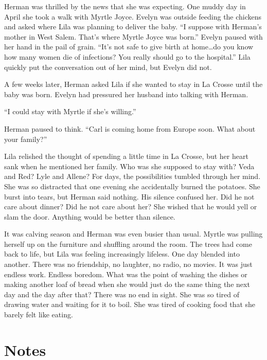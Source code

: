 \documentclass[
  letterpaper,
]{book}
\begin{document}
Herman was thrilled by the news that she was expecting. One muddy day in
April she took a walk with Myrtle Joyce. Evelyn was outside feeding the
chickens and asked where Lila was planning to deliver the baby. ``I
suppose with Herman's mother in West Salem. That's where Myrtle Joyce
was born.'' Evelyn paused with her hand in the pail of grain. ``It's not
safe to give birth at home\ldots do you know how many women die of
infections? You really should go to the hospital.'' Lila quickly put the
conversation out of her mind, but Evelyn did not.

A few weeks later, Herman asked Lila if she wanted to stay in La Crosse
until the baby was born. Evelyn had pressured her husband into talking
with Herman.

``I could stay with Myrtle if she's willing.''

Herman paused to think. ``Carl is coming home from Europe soon. What
about your family?''

Lila relished the thought of spending a little time in La Crosse, but
her heart sank when he mentioned her family. Who was she supposed to
stay with? Veda and Red? Lyle and Allene? For days, the possibilities
tumbled through her mind. She was so distracted that one evening she
accidentally burned the potatoes. She burst into tears, but Herman said
nothing. His silence confused her. Did he not care about dinner? Did he
not care about her? She wished that he would yell or slam the door.
Anything would be better than silence.

It was calving season and Herman was even busier than usual. Myrtle was
pulling herself up on the furniture and shuffling around the room. The
trees had come back to life, but Lila was feeling increasingly lifeless.
One day blended into another. There was no friendship, no laughter, no
radio, no movies. It was just endless work. Endless boredom. What was
the point of washing the dishes or making another loaf of bread when she
would just do the same thing the next day and the day after that? There
was no end in sight. She was so tired of drawing water and waiting for
it to boil. She was tired of cooking food that she barely felt like
eating.

\section{Notes}\label{notes-38}
\end{document}
